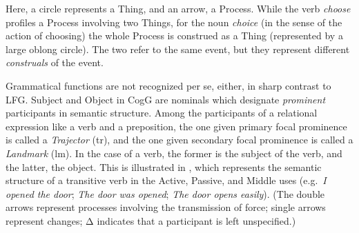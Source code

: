 \documentclass[output=paper,japanesefont,hidelinks]{langscibook}
\begin{document}
Here, a circle represents a Thing, and an arrow, a Process. While the verb \textit{choose} profiles a Process involving two Things, for the noun \textit{choice} (in the sense of the action of choosing) the whole Process is construed as a Thing (represented by a large oblong circle). The two refer to the same event, but they represent different \textit{construals} of the event.

Grammatical functions are not recognized per se, either, in sharp contrast to LFG. Subject and Object in CogG are nominals which designate \textit{prominent} participants in semantic structure. Among the participants of a relational expression like a verb and a preposition, the one given primary focal prominence is called a \textit{Trajector} (tr), and the one given secondary focal prominence is called a \textit{Landmark} (lm). In the case of a verb, the former is the subject of the verb, and the latter, the object. This is illustrated in , which represents the semantic structure of a transitive verb in the Active, Passive, and Middle uses (e.g.\ \textit{I opened the door}; \textit{The door was opened}; \textit{The door opens easily}). (The double arrows represent processes involving the transmission of force; single arrows represent changes; Δ indicates that a participant is left unspecified.)
\end{document}
